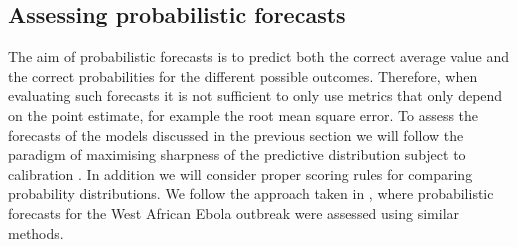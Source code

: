\documentclass[12pt]{article}
\begin{document}
\subsection{Assessing probabilistic forecasts}

The aim of probabilistic forecasts is to predict both the correct average value and the correct probabilities for the different possible outcomes. Therefore, when evaluating such forecasts it is not sufficient to only use metrics that only depend on the point estimate, for example the root mean square error. To assess the forecasts of the models discussed in the previous section we will follow the paradigm of maximising sharpness of the predictive distribution subject to calibration \cite{gneitingProbabilisticForecastsCalibration2007}. In addition we will consider proper scoring rules for comparing probability distributions. We follow the approach taken in \cite{funkAssessingPerformanceRealtime2019}, where probabilistic forecasts for the West African Ebola outbreak were assessed using similar methods.
\end{document}

